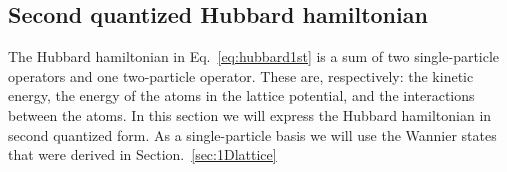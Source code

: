 \documentclass[oneside,11pt]{memoir}
\newcommand{\vo}{\ensuremath{V_{0}}}
\begin{document}
\subsection{Second quantized Hubbard hamiltonian}

The Hubbard hamiltonian in Eq.~\ref{eq:hubbard1st} is a sum of two
single-particle operators and one two-particle operator.  These are,
respectively: the kinetic energy, the energy of the atoms in the lattice
potential, and the interactions between the atoms.  In this section we will
express the Hubbard hamiltonian in second quantized form.  As a single-particle
basis we will use the Wannier states that were derived in
Section.~\ref{sec:1Dlattice}

\end{document}
